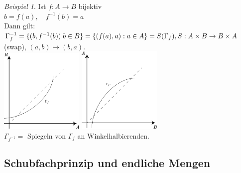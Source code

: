 \documentclass[12pt,a4paper,titlepage]{article} %
\theoremstyle{definition}
\theoremstyle{remark}
\newtheorem*{bsp}{Beispiel}
\begin{document}
\begin{bsp}
	Ist $f: A\rightarrow B$ bijektiv\\
	$b=f(a),\quad f^{-1}(b)=a$\\
	Dann gilt: $\Gamma_f^{-1} = \{(b, f^{-1}(b)) | b\in B\}\\
	= \{(f(a),a):a\in A\} = S(\Gamma_f), S: A\times B \rightarrow B\times A$ (swap), $(a,b)\mapsto(b,a)$.\\
	\includegraphics[width=0.3\textwidth]{images/img08.png} \quad
	\includegraphics[width=0.3\textwidth]{images/img09.png}\\
	$\Gamma_{f^{-1}} = $ Spiegeln von $\Gamma_f$ an Winkelhalbierenden.
\end{bsp}
\subsection{Schubfachprinzip und endliche Mengen}
\end{document}
